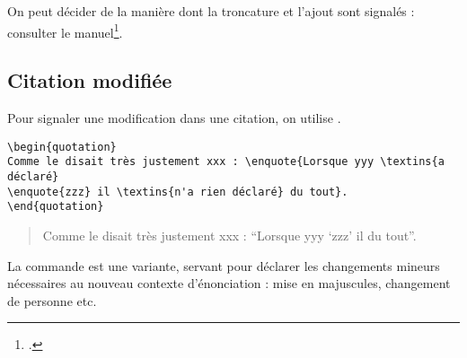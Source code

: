 \begin{anedocte}
On peut décider de la manière dont la troncature et l'ajout sont signalés : consulter le manuel\footcite{csquotes_ellipses}.
\end{anedocte}

\subsection{Citation modifiée}

Pour signaler une modification dans une citation, on utilise  .
\begin{verbatim}
\begin{quotation}
Comme le disait très justement xxx : \enquote{Lorsque yyy \textins{a déclaré}
\enquote{zzz} il \textins{n'a rien déclaré} du tout}.
\end{quotation}
\end{verbatim}

\begin{quotation}
	Comme le disait très justement xxx : \enquote{Lorsque yyy  \enquote{zzz} il  du tout}.
\end{quotation}

La commande  est une variante, servant pour déclarer les changements mineurs nécessaires au nouveau contexte d'énonciation : mise en majuscules, changement de personne etc.
